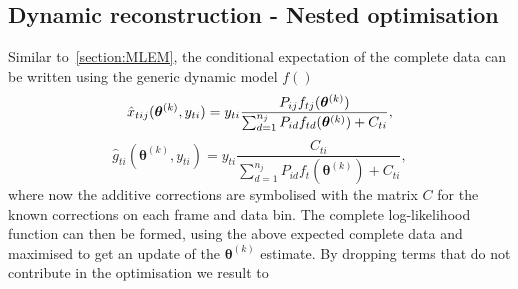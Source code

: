 \subsection{Dynamic reconstruction - Nested optimisation}
Similar to~\ref{section:MLEM}, the conditional expectation of the complete data can be written using the generic dynamic model $f()$  
\begin{equation}
\label{eq:Dynamic_complete_Data_Expectation}
\hat{x}_{tij}(\bm{\theta}^{(k)},y_{ti}) = y_{ti}
\frac{P_{ij} f_{tj}(\bm\theta^{(k)})}
{\sum_{d=1}^{n_j} P_{id} f_{td}(\bm\theta^{(k)}) + C_{ti}}\\,
\end{equation}
%
\begin{equation}
\label{eq:Dynamic_complete_Data_Expectation2}
\hat{g}_{ti}(\bm{\theta}^{(k)},y_{ti}) = y_{ti}
\frac{C_{ti}}{\sum_{d=1}^{n_j} P_{id} f_t(\bm\theta^{(k)}) + C_{ti}} ,
\end{equation}
%
where now the additive corrections are symbolised with the matrix $C$ for the known corrections on each frame and data bin.
The complete log-likelihood function can then be formed, using the above expected complete data and maximised to get an update of the $\bm\theta^{(k)}$ estimate. By dropping terms that do not contribute in the optimisation we result to
